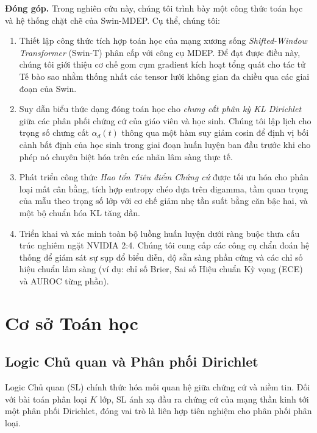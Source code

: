 \documentclass[11pt]{article}
\begin{document}
\textbf{Đóng góp.} Trong nghiên cứu này, chúng tôi trình bày một công thức toán học và hệ thống chặt chẽ của Swin-MDEP. Cụ thể, chúng tôi:
\begin{enumerate}[label=(\arabic*)]
    \item Thiết lập công thức tích hợp toán học của mạng xương sống \emph{Shifted-Window Transformer} (Swin-T) phân cấp với công cụ MDEP. Để đạt được điều này, chúng tôi giới thiệu cơ chế gom cụm gradient kích hoạt tổng quát cho tác tử Tế bào sao nhằm thống nhất các tensor lưới không gian đa chiều qua các giai đoạn của Swin.
    \item Suy dẫn biểu thức dạng đóng toán học cho \emph{chưng cất phân kỳ KL Dirichlet} giữa các phân phối chứng cứ của giáo viên và học sinh. Chúng tôi lập lịch cho trọng số chưng cất $\alpha_d(t)$ thông qua một hàm suy giảm cosin để định vị bối cảnh bất định của học sinh trong giai đoạn huấn luyện ban đầu trước khi cho phép nó chuyên biệt hóa trên các nhãn lâm sàng thực tế.
    \item Phát triển công thức \emph{Hao tổn Tiêu điểm Chứng cứ} được tối ưu hóa cho phân loại mất cân bằng, tích hợp entropy chéo dựa trên digamma, tầm quan trọng của mẫu theo trọng số lớp với cơ chế giảm nhẹ tần suất bằng căn bậc hai, và một bộ chuẩn hóa KL tăng dần.
    \item Triển khai và xác minh toàn bộ luồng huấn luyện dưới ràng buộc thưa cấu trúc nghiêm ngặt NVIDIA 2:4. Chúng tôi cung cấp các công cụ chẩn đoán hệ thống để giám sát sự sụp đổ biểu diễn, độ sẵn sàng phần cứng và các chỉ số hiệu chuẩn lâm sàng (ví dụ: chỉ số Brier, Sai số Hiệu chuẩn Kỳ vọng (ECE) và AUROC từng phần).
\end{enumerate}

\section{Cơ sở Toán học}\label{sec:foundations}

\subsection{Logic Chủ quan và Phân phối Dirichlet}\label{subsec:dirichlet}

Logic Chủ quan (SL) chính thức hóa mối quan hệ giữa chứng cứ và niềm tin. Đối với bài toán phân loại $K$ lớp, SL ánh xạ đầu ra chứng cứ của mạng thần kinh tới một phân phối Dirichlet, đóng vai trò là liên hợp tiên nghiệm cho phân phối phân loại.
\end{document}
